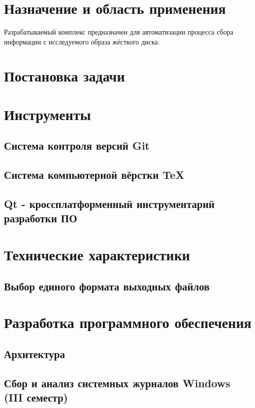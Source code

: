\documentclass[russian,utf8,14pt,simple]{eskdtext}
\begin{document}
\section{Назначение и область применения}
Разрабатываемый комплекс предназначен для автоматизации процесса сбора информации с исследуемого образа жёсткого диска.
\section{Постановка задачи}
\setcounter{figure}{0}

\section{Инструменты}
\setcounter{figure}{0}
\subsection{Система контроля версий Git}

\subsection{Система компьютерной вёрстки \TeX}

\subsection{Qt - кроссплатформенный инструментарий разработки ПО}


\section{Технические характеристики}

\subsection{Выбор единого формата выходных файлов}


\section{Разработка программного обеспечения}
\setcounter{figure}{0}

\subsection{Архитектура}

\subsection{Сбор и анализ системных журналов Windows (III семестр)} %

\end{document}
